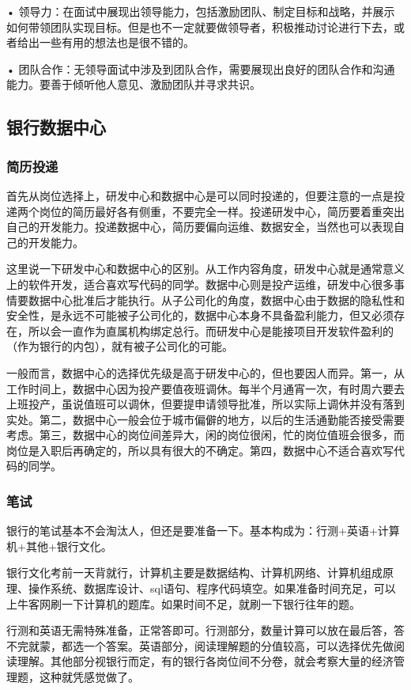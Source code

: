•	领导力：在面试中展现出领导能力，包括激励团队、制定目标和战略，并展示如何带领团队实现目标。但是也不一定就要做领导者，积极推动讨论进行下去，或者给出一些有用的想法也是很不错的。

•	团队合作：无领导面试中涉及到团队合作，需要展现出良好的团队合作和沟通能力。要善于倾听他人意见、激励团队并寻求共识。


\subsection{银行数据中心}
\subsubsection{简历投递}

首先从岗位选择上，研发中心和数据中心是可以同时投递的，但要注意的一点是投递两个岗位的简历最好各有侧重，不要完全一样。投递研发中心，简历要着重突出自己的开发能力。投递数据中心，简历要偏向运维、数据安全，当然也可以表现自己的开发能力。

这里说一下研发中心和数据中心的区别。从工作内容角度，研发中心就是通常意义上的软件开发，适合喜欢写代码的同学。数据中心则是投产运维，研发中心很多事情要数据中心批准后才能执行。从子公司化的角度，数据中心由于数据的隐私性和安全性，是永远不可能被子公司化的，数据中心本身不具备盈利能力，但又必须存在，所以会一直作为直属机构绑定总行。而研发中心是能接项目开发软件盈利的（作为银行的内包），就有被子公司化的可能。

一般而言，数据中心的选择优先级是高于研发中心的，但也要因人而异。第一，从工作时间上，数据中心因为投产要值夜班调休。每半个月通宵一次，有时周六要去上班投产，虽说值班可以调休，但要提申请领导批准，所以实际上调休并没有落到实处。第二，数据中心一般会位于城市偏僻的地方，以后的生活通勤能否接受需要考虑。第三，数据中心的岗位间差异大，闲的岗位很闲，忙的岗位值班会很多，而岗位是入职后再确定的，所以具有很大的不确定。第四，数据中心不适合喜欢写代码的同学。

\subsubsection{笔试}
银行的笔试基本不会淘汰人，但还是要准备一下。基本构成为：行测+英语+计算机+其他+银行文化。

银行文化考前一天背就行，计算机主要是数据结构、计算机网络、计算机组成原理、操作系统、数据库设计、sql语句、程序代码填空。如果准备时间充足，可以上牛客网刷一下计算机的题库。如果时间不足，就刷一下银行往年的题。

行测和英语无需特殊准备，正常答即可。行测部分，数量计算可以放在最后答，答不完就蒙，都选一个答案。英语部分，阅读理解题的分值较高，可以选择优先做阅读理解。其他部分视银行而定，有的银行各岗位间不分卷，就会考察大量的经济管理题，这种就凭感觉做了。

